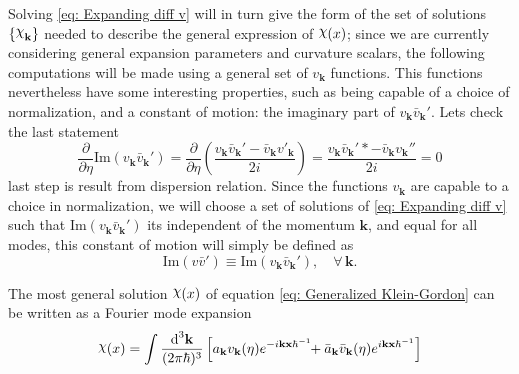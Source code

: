 Solving \cref{eq: Expanding diff v} will in turn give the form of the set of solutions $\left\{\rchi_{\mathbf{k}}\right\}$ needed to describe the general expression of $\rchi(x)$; since we are currently considering general expansion parameters and curvature scalars, the following computations will be made using a general set of $v_\mathbf{k}$ functions. This functions nevertheless have some interesting properties, such as being capable of a choice of normalization, and a constant of motion: the imaginary part of $v_\mathbf{k}\bar{v}_\mathbf{k}'$. Lets check the last statement
\begin{equation}
	\frac{\partial}{\partial \eta }\text{Im}(v_\mathbf{k}\bar{v}_\mathbf{k}')=\frac{\partial}{\partial \eta}\left(\frac{v_\mathbf{k}\bar{v}_\mathbf{k}'-\bar v_\mathbf{k}v'_\mathbf{k}}{2i}\right)=\frac{v_\mathbf{k}\bar v_\mathbf{k}'*-\bar v_\mathbf{k}v_\mathbf{k}''}{2i}=0
\end{equation}
last step is result from dispersion relation. Since the functions $v_\mathbf{k}$ are capable to a choice in normalization, we will choose a set of solutions of \cref{eq: Expanding diff v} such that $\text{Im}(v_\mathbf{k}\bar{v}_\mathbf{k}')$ its independent of the momentum $\mathbf{k}$, and equal for all modes, this constant of motion will simply be defined as
\begin{equation}
	\text{Im}(v\bar{v}')\equiv \text{Im}(v_\mathbf{k}\bar{v}_\mathbf{k}'),\quad \forall\,\mathbf{k}.
\end{equation}

The most general solution $\rchi(x)$ of equation \cref{eq: Generalized Klein-Gordon} can be written as a Fourier mode expansion
\begin{equation}
	\rchi(x)=\int\frac{\td^3\mathbf{k}}{(2\pi\hbar)^3}\left[a_\mathbf{k}v_\mathbf{k}(\eta)e^{-i\mathbf{kx}\hbar^{-1}}\!\!+\bar a_\mathbf{k}\bar v_\mathbf{k}(\eta)e^{i\mathbf{kx}\hbar^{-1}}\right]
\end{equation}

